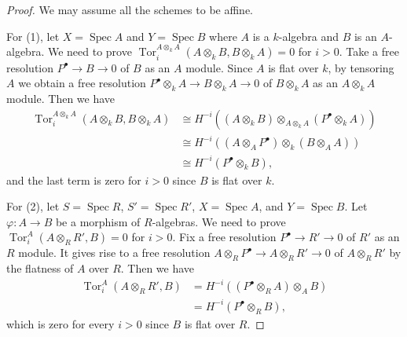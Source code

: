 \documentclass{amsart}
\numberwithin{equation}{section}
\theoremstyle{plain}
\theoremstyle{definition}
\DeclareMathOperator{\Tor}{\mathrm{Tor}}
\DeclareMathOperator{\Spec}{\mathrm{Spec}}
\begin{document}
\begin{proof}
    We may assume all the schemes to be affine.

    For (1), let $X = \Spec A$ and $Y = \Spec B$ where $A$ is a $k$-algebra and $B$ is an $A$-algebra.
    We need to prove $\Tor_i^{A \otimes_k A}(A \otimes_k B, B\otimes_k A)=0$ for $i>0$.
    Take a free resolution $P^\bullet \to B \to 0$ of $B$ as an $A$ module.
    Since $A$ is flat over $k$, by tensoring $A$ we obtain a free resolution
    $
        P^\bullet \otimes_k A \to B \otimes_k A \to 0
    $
    of $B \otimes_k A$ as an $A \otimes_k A$ module.
    Then we have\begin{align*}
        \Tor_i^{A \otimes_k A}(A \otimes_k B, B\otimes_k A) & \cong H^{-i}((A \otimes_k B)\otimes_{A \otimes_k A}(P^\bullet \otimes_k A)) \\                                                                  & \cong H^{-i}((A \otimes_A P^\bullet)\otimes_k (B \otimes_A A))              \\
                                                            & \cong  H^{-i}(P^\bullet \otimes_k B),
    \end{align*}
    and the last term is zero for $i>0$ since $B$ is flat over $k$.

    For (2), let $S = \Spec R$, $S' = \Spec R'$, $X = \Spec A$, and $Y = \Spec B$.
    Let $\varphi \colon A \to B$ be a morphism of $R$-algebras.
    We need to prove $\Tor_i^{A}(A \otimes_R R', B)=0$ for $i>0$.
    Fix a free resolution $P^\bullet \to R' \to 0$ of $R'$ as an $R$ module.
    It gives rise to a free resolution $A \otimes_R P^\bullet \to A \otimes_R R' \to 0$ of $A \otimes_R R'$ by the flatness of $A$ over $R$.
    Then we have
    \begin{align}
        \Tor^A_i(A \otimes_R R', B) & = H^{-i}((P^\bullet \otimes_R A) \otimes_A B) \\
                                    & = H^{-i}(P^\bullet \otimes_R  B),
    \end{align}
    which is zero for every $i>0$ since $B$ is flat over $R$.
\end{proof}
\end{document}
